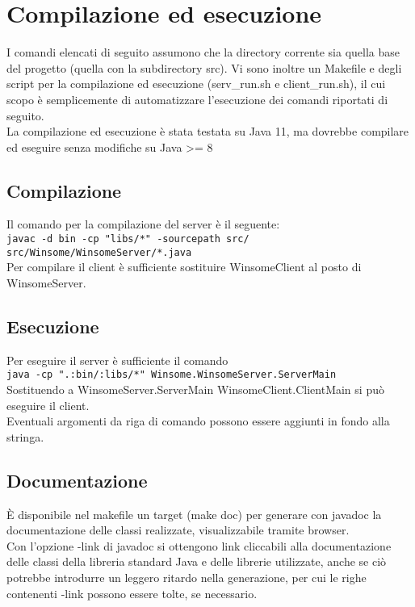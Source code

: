 \section{Compilazione ed esecuzione}
I comandi elencati di seguito assumono che la directory corrente sia quella base del progetto
(quella con la subdirectory src). Vi sono inoltre un Makefile e degli script per la compilazione ed esecuzione (serv\_run.sh e client\_run.sh), il cui scopo è semplicemente di automatizzare l'esecuzione dei comandi riportati di seguito.\\
La compilazione ed esecuzione è stata testata su Java 11, ma dovrebbe compilare ed eseguire senza modifiche su Java >= 8

\subsection{Compilazione}
Il comando per la compilazione del server è il seguente:\\
\verb|javac -d bin -cp "libs/*" -sourcepath src/ src/Winsome/WinsomeServer/*.java|\\
Per compilare il client è sufficiente sostituire WinsomeClient al posto di WinsomeServer.
\subsection{Esecuzione}
Per eseguire il server è sufficiente il comando\\
\verb|java -cp ".:bin/:libs/*" Winsome.WinsomeServer.ServerMain|\\
Sostituendo a WinsomeServer.ServerMain WinsomeClient.ClientMain si può eseguire il client.\\
Eventuali argomenti da riga di comando possono essere aggiunti in fondo alla stringa.
\subsection{Documentazione}
È disponibile nel makefile un target (make doc) per generare con javadoc la documentazione delle classi realizzate, visualizzabile tramite browser.\\
Con l'opzione -link di javadoc si ottengono link cliccabili alla documentazione delle classi della libreria standard Java e delle librerie utilizzate, anche se ciò potrebbe introdurre un leggero ritardo nella generazione, per cui le righe contenenti -link possono essere tolte, se necessario.\\